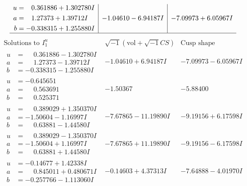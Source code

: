 \documentclass[1p]{elsarticle_modified}
\theoremstyle{definition}
\newcommand{\I}{\sqrt{-1}}
\begin{document}
$$\begin{array}{c|c|c}
\begin{aligned}
u &= \phantom{-}0.361886 + 1.302780 I \\
a &= \phantom{-}1.27373 + 1.39712 I \\
b &= -0.338315 + 1.255880 I\end{aligned}
 & -1.04610 - 6.94187 I & -7.09973 + 6.05967 I\\
 \hline 
 \end{array}$$\newpage$$\begin{array}{c|c|c}  
\text{Solutions to }I^u_{1}& \I (\text{vol} + \sqrt{-1}CS) & \text{Cusp shape}\\
 \hline 
\begin{aligned}
u &= \phantom{-}0.361886 - 1.302780 I \\
a &= \phantom{-}1.27373 - 1.39712 I \\
b &= -0.338315 - 1.255880 I\end{aligned}
 & -1.04610 + 6.94187 I & -7.09973 - 6.05967 I \\ \hline\begin{aligned}
u &= -0.645651\phantom{ +0.000000I} \\
a &= \phantom{-}0.563691\phantom{ +0.000000I} \\
b &= \phantom{-}0.525371\phantom{ +0.000000I}\end{aligned}
 & -1.50367\phantom{ +0.000000I} & -5.88400\phantom{ +0.000000I} \\ \hline\begin{aligned}
u &= \phantom{-}0.389029 + 1.350370 I \\
a &= -1.50604 - 1.16997 I \\
b &= \phantom{-}0.63881 - 1.44580 I\end{aligned}
 & -7.67865 - 11.19890 I & -9.19156 + 6.17598 I \\ \hline\begin{aligned}
u &= \phantom{-}0.389029 - 1.350370 I \\
a &= -1.50604 + 1.16997 I \\
b &= \phantom{-}0.63881 + 1.44580 I\end{aligned}
 & -7.67865 + 11.19890 I & -9.19156 - 6.17598 I \\ \hline\begin{aligned}
u &= -0.14677 + 1.42338 I \\
a &= \phantom{-}0.845011 + 0.480671 I \\
b &= -0.257766 - 1.113060 I\end{aligned}
 & -0.14603 + 4.37313 I & -7.64888 - 4.01970 I \\ \hline\begin{aligned}

\end{aligned}
\end{array}$$
\end{document}
